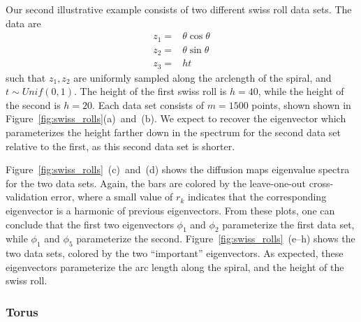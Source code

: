 \documentclass[preprint]{elsarticle}
\begin{document}
Our second illustrative example consists of two different swiss roll data sets.
%
The data are
\begin{equation}
\begin{aligned}
z_1 =& \theta \cos \theta \\
z_2 =& \theta \sin \theta \\
z_3 =& h t
\end{aligned}
\end{equation}
%
such that $z_1, z_2$ are uniformly sampled along the arclength of the spiral, and $t \sim Unif(0,1)$. 
%
The height of the first swiss roll is $h = 40$, while the height of the second is $h = 20$. 
%
Each data set consists of $m=1500$ points, shown shown in Figure~\ref{fig:swiss_rolls}(a)~and~(b).
%
We expect to recover the eigenvector which parameterizes the height farther down in the spectrum for the second data set relative to the first, as this second data set is shorter.

Figure~\ref{fig:swiss_rolls}~(c)~and~(d) shows the diffusion maps eigenvalue spectra for the two data sets.
%
Again, the bars are colored by the leave-one-out cross-validation error, where a small value of $r_k$ indicates that the corresponding eigenvector is a harmonic of previous eigenvectors. 
%
From these plots, one can conclude that the first two eigenvectors $\phi_1$ and $\phi_2$ parameterize the first data set, while $\phi_1$ and $\phi_5$ parameterize the second. 
%
Figure~\ref{fig:swiss_rolls}~(e--h) shows the two data sets, colored by the two ``important'' eigenvectors. 
%
As expected, these eigenvectors parameterize the arc length along the spiral, and the height of the swiss roll. 

\subsubsection{Torus}
\end{document}
